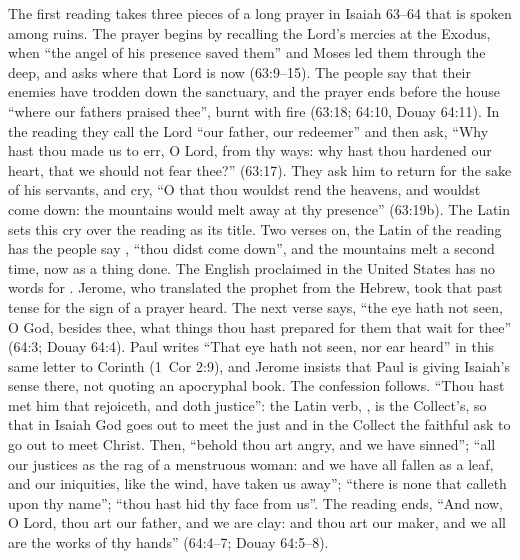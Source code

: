 The first reading takes three pieces of a long prayer in Isaiah 63--64 that
is spoken among ruins. The prayer begins by recalling the Lord's mercies at
the Exodus, when ``the angel of his presence saved them'' and Moses led them
through the deep, and asks where that Lord is now (63:9--15). The people say
that their enemies have trodden down the sanctuary, and the prayer ends before
the house ``where our fathers praised thee'', burnt with fire (63:18; 64:10,
Douay 64:11). In the reading they call the Lord ``our father, our
redeemer'' and then ask, ``Why hast thou made us to err, O Lord, from thy
ways: why hast thou hardened our heart, that we should not fear thee?''
(63:17). They ask him to return for the sake of his servants, and cry, ``O
that thou wouldst rend the heavens, and wouldst come down: the mountains would
melt away at thy presence'' (63:19b). The Latin 
sets this cry over the reading as its title. Two verses on, the Latin of the reading has the people say , ``thou didst come down'', and
the mountains melt a second time, now as a thing done. The English proclaimed
in the United States has no words for . Jerome, who
translated the prophet from the Hebrew, took that past tense for the sign of a
prayer heard. The next verse says, ``the eye hath not seen, O God, besides
thee, what things thou hast prepared for them that wait for thee'' (64:3;
Douay 64:4). Paul writes ``That eye hath not seen, nor ear heard'' in this
same letter to Corinth (1~Cor 2:9), and Jerome insists that Paul is giving
Isaiah's sense there, not quoting an apocryphal book. The confession
follows. ``Thou hast met him that rejoiceth, and
doth justice'': the Latin verb, , is the Collect's, so that
in Isaiah God goes out to meet the just and in the Collect the faithful ask to
go out to meet Christ. Then, ``behold thou art angry, and we have sinned'';
``all our justices as the rag of a menstruous woman: and we have all fallen
as a leaf, and our iniquities, like the wind, have taken us away''; ``there is
none that
calleth upon thy name''; ``thou hast hid thy face from us''. The reading ends,
``And now, O Lord, thou art our father, and we are clay: and thou art our
maker, and we all are the works of thy hands'' (64:4--7; Douay 64:5--8).

